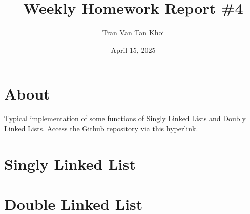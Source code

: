 \documentclass{article}
\author{Tran Van Tan Khoi}
\title{Weekly Homework Report \#4}
\date{April 15, 2025}
\begin{document}
\maketitle

\section{About}

Typical implementation of some functions of Singly Linked Lists and Doubly Linked Lists. Access the Github repository via this \href{https://github.com/xtrkoi/throwaway-re}{hyperlink}.

\section{Singly Linked List}


\section{Double Linked List}
\end{document}
